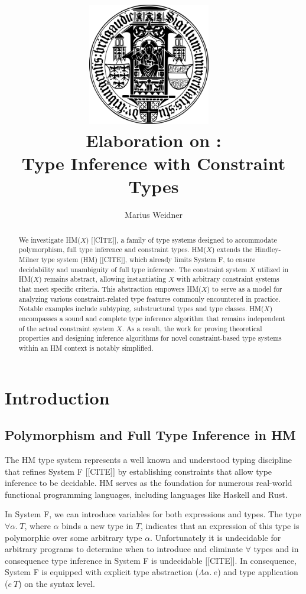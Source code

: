 \documentclass[runningheads]{llncs}
\title{\includegraphics[width=0.4\textwidth]{logo.png}~\\[1cm] Elaboration on
  \hmx:\\Type Inference with Constraint Types}
\institute{Chair of Programming Languages, University of Freiburg \\
  \email{weidner@cs.uni-freiburg.de}}
\author{Marius Weidner}
\newcommand{\hmx}{HM($X$)}
\begin{document}
\let\oldaddcontentsline\addcontentsline{}
\def\addcontentsline#1#2#3{}
\maketitle
\def\addcontentsline#1#2#3{\oldaddcontentsline{#1}{#2}{#3}}

\begin{abstract}
  We investigate \hmx{} [[CITE]], a family of type systems designed to
  accommodate
  polymorphism, full type inference and constraint types.
  \hmx{} extends the Hindley-Milner type system (HM) [[CITE]], which already
  limits
  System F, to ensure decidability and unambiguity of full type inference.
  The constraint system $X$ utilized in \hmx{} remains abstract, allowing
  instantiating $X$ with arbitrary constraint systems that meet specific
  criteria.
  This abstraction empowers \hmx{} to serve as a model for analyzing various
  constraint-related type features commonly encountered in practice.
  Notable examples include subtyping, substructural
  types and type classes.
  \hmx{} encompasses a sound and complete type inference algorithm that remains
  independent of the actual constraint system
  $X$.
  As a result, the work for proving theoretical properties and designing
  inference algorithms for novel constraint-based type systems within an
  HM context is notably simplified.
\end{abstract}

\setcounter{tocdepth}{2}
\tableofcontents
\newpage

\section{Introduction}
\subsection{Polymorphism and Full Type Inference in HM}
The HM type system represents a well known and understood typing discipline
that
refines System F [[CITE]] by establishing constraints that allow type inference
to be decidable.
HM serves as the foundation for numerous real-world functional programming
languages, including languages like Haskell and Rust.

In System F, we can introduce variables for both expressions and types.
The type $∀α. \ T$, where $α$ binds a new type in $T$,
indicates that an expression of this type is polymorphic over some
arbitrary type $α$.
Unfortunately it is undecidable for arbitrary programs to determine when to
introduce and eliminate $∀$ types and in consequence type inference in System F
is undecidable [[CITE]].
In consequence, System F is equipped with explicit type abstraction ($Λα. \ e$)
and type
application ($e \ T$) on the syntax level.
\end{document}
